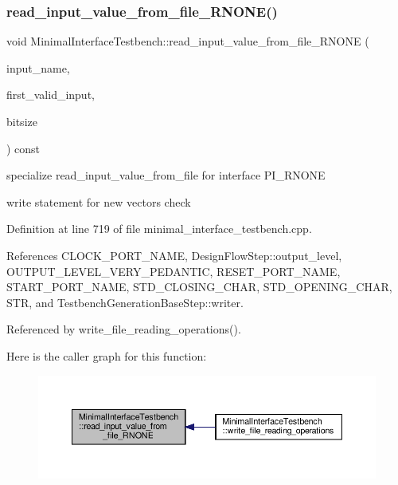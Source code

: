 \subsubsection{\texorpdfstring{read\+\_\+input\+\_\+value\+\_\+from\+\_\+file\+\_\+\+R\+N\+O\+N\+E()}{read\_input\_value\_from\_file\_RNONE()}}
{\footnotesize\ttfamily void Minimal\+Interface\+Testbench\+::read\+\_\+input\+\_\+value\+\_\+from\+\_\+file\+\_\+\+R\+N\+O\+NE (\begin{DoxyParamCaption}\item[{const std\+::string \&}]{input\+\_\+name,  }\item[{bool \&}]{first\+\_\+valid\+\_\+input,  }\item[{unsigned}]{bitsize }\end{DoxyParamCaption}) const\hspace{0.3cm}{\ttfamily [protected]}}



specialize read\+\_\+input\+\_\+value\+\_\+from\+\_\+file for interface P\+I\+\_\+\+R\+N\+O\+NE 

write statement for new vectors\textquotesingle{} check 

Definition at line 719 of file minimal\+\_\+interface\+\_\+testbench.\+cpp.



References C\+L\+O\+C\+K\+\_\+\+P\+O\+R\+T\+\_\+\+N\+A\+ME, Design\+Flow\+Step\+::output\+\_\+level, O\+U\+T\+P\+U\+T\+\_\+\+L\+E\+V\+E\+L\+\_\+\+V\+E\+R\+Y\+\_\+\+P\+E\+D\+A\+N\+T\+IC, R\+E\+S\+E\+T\+\_\+\+P\+O\+R\+T\+\_\+\+N\+A\+ME, S\+T\+A\+R\+T\+\_\+\+P\+O\+R\+T\+\_\+\+N\+A\+ME, S\+T\+D\+\_\+\+C\+L\+O\+S\+I\+N\+G\+\_\+\+C\+H\+AR, S\+T\+D\+\_\+\+O\+P\+E\+N\+I\+N\+G\+\_\+\+C\+H\+AR, S\+TR, and Testbench\+Generation\+Base\+Step\+::writer.



Referenced by write\+\_\+file\+\_\+reading\+\_\+operations().

Here is the caller graph for this function\+:
\nopagebreak
\begin{figure}[H]
\begin{center}
\leavevmode
\includegraphics[width=350pt]{d0/dba/classMinimalInterfaceTestbench_ad133b062afb651685cf860a0b218d330_icgraph}
\end{center}
\end{figure}
\mbox{\label{classMinimalInterfaceTestbench_a646e461dfe469649ac2f67a7dac554b9}} 
